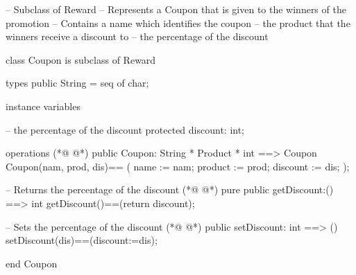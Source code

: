 \begin{vdmpp}[breaklines=true]
-- Subclass of Reward
-- Represents a Coupon that is given to the winners of the promotion
-- Contains a name which identifies the coupon
--      the product that the winners receive a discount to
--          the percentage of the discount

class Coupon is subclass of Reward

  types
  public String = seq of char;
  
 instance variables
 
   -- the percentage of the discount
    protected discount: int;
    
  operations 
(*@
\label{Coupon:18}
@*)
   public Coupon: String * Product * int ==> Coupon
     Coupon(nam, prod, dis)==
     (
     name := nam;
     product := prod;
     discount := dis;
     );
     
   -- Returns the percentage of the discount        
(*@
\label{getDiscount:27}
@*)
   pure public getDiscount:() ==> int
   getDiscount()==(return discount);
   
   -- Sets the percentage of the discount    
(*@
\label{setDiscount:31}
@*)
   public setDiscount: int ==> ()
  setDiscount(dis)==(discount:=dis);
     
end Coupon
\end{vdmpp}
